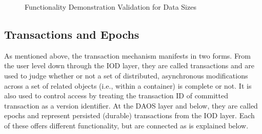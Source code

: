 \documentclass[conference]{IEEEtran} \pdfpagewidth=8.5in
\begin{document}
\begin{figure}[htbp!]
\centering
\caption{Functionality Demonstration Validation for Data Sizes}
\label{fig:eval-size}
\end{figure}

\subsection{Transactions and Epochs}
\label{sec:transactions}

As mentioned above, the transaction mechanism manifests in two forms. From the
user level down through the IOD layer, they are called transactions and are
used to judge whether or not a set of distributed, asynchronous modifications
across a set of related objects (i.e., within a container) is complete or not.
It is also used to control access by treating the transaction ID of committed
transaction as a version identifier.  At the DAOS layer and below, they are
called epochs and represent persisted (durable) transactions from the IOD
layer. Each of these offers different functionality, but are connected as is
explained below.
\end{document}
